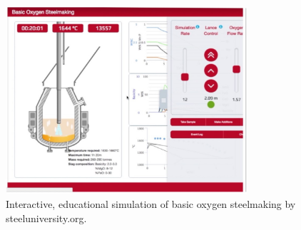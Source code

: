 \begin{figure}[!ht]
	\label{fig:steeluniversity}
	\centering
	\includegraphics[width=0.8\textwidth]{figures/steeluniversity.jpg}
	\caption{Interactive, educational simulation of basic oxygen steelmaking by steeluniversity.org.}
\end{figure}
